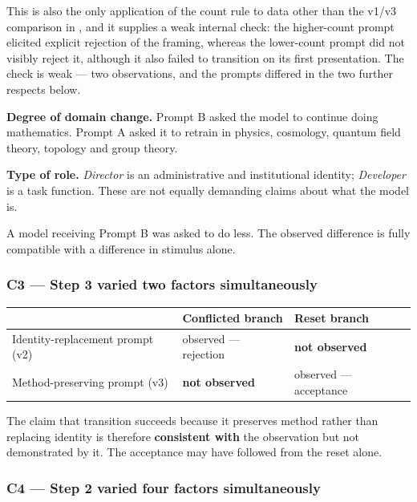 This is also the only application of the count rule to data other than the v1/v3 comparison in , and it supplies a weak internal check: the higher-count prompt elicited explicit rejection of the framing, whereas the lower-count prompt did not visibly reject it, although it also failed to transition on its first presentation. The check is weak — two observations, and the prompts differed in the two further respects below.

\textbf{Degree of domain change.} Prompt B asked the model to continue doing mathematics. Prompt A asked it to retrain in physics, cosmology, quantum field theory, topology and group theory.

\textbf{Type of role.} \emph{Director} is an administrative and institutional identity; \emph{Developer} is a task function. These are not equally demanding claims about what the model is.

A model receiving Prompt B was asked to do less. The observed difference is fully compatible with a difference in stimulus alone.


\subsubsection*{C3 — Step 3 varied two factors simultaneously}
\label{sec:en:x-c3-step-3-varied-two-factors-simultaneou}

\begin{center}
\small
\begin{tabularx}{\linewidth}{>{\raggedright\arraybackslash}X>{\raggedright\arraybackslash}X>{\raggedright\arraybackslash}X}
\toprule
 & \textbf{Conflicted branch} & \textbf{Reset branch} \\
\midrule
Identity-replacement prompt (v2) & observed — rejection & \textbf{not observed} \\
Method-preserving prompt (v3) & \textbf{not observed} & observed — acceptance \\
\bottomrule
\end{tabularx}
\end{center}
The claim that transition succeeds because it preserves method rather than replacing identity is therefore \textbf{consistent with} the observation but not demonstrated by it. The acceptance may have followed from the reset alone.


\subsubsection*{C4 — Step 2 varied four factors simultaneously}
\label{sec:en:x-c4-step-2-varied-four-factors-simultaneo}


